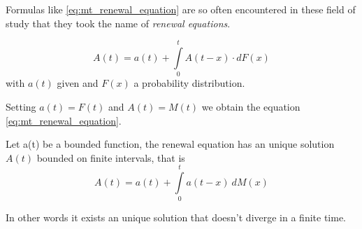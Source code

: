 \begin{definition}
	Formulas like \eqref{eq:mt_renewal_equation} are so often encountered in these field of study that they took the name of \emph{renewal equations}.

	\begin{equation} \label{eq:renewal_equation}
			A(t) = a(t) +\int\limits_0^{t}A(t-x) \cdot dF(x)
	\end{equation}
	with $a(t)$ given and $F(x)$ a probability distribution.

	Setting $a(t) = F(t)$ and $A(t) = M(t)$ we obtain the equation \eqref{eq:mt_renewal_equation}.
\end{definition}

\begin{theorem}[4.1 K.T. p.184]
	Let a(t) be a bounded function, the renewal equation has an unique solution $A(t)$ bounded on finite intervals, that is
	\begin{equation} \label{eq:renewal_solution}
		A(t) = a(t) + \int\limits_0^{t} a(t-x) ~ dM(x)
	\end{equation}
\end{theorem}
In other words it exists an unique solution that doesn't diverge in a finite time.
